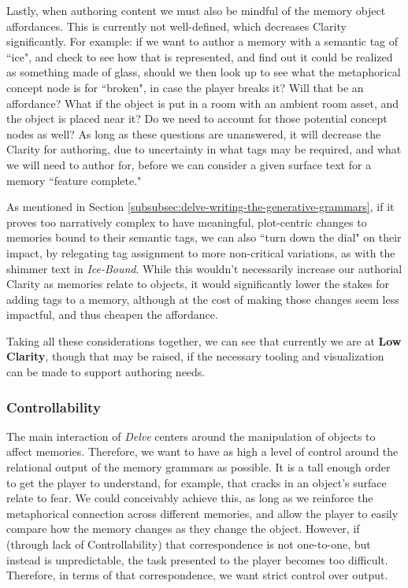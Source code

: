 Lastly, when authoring content we must also be mindful of the memory object affordances. This is currently not well-defined, which decreases Clarity significantly. For example: if we want to author a memory with a semantic tag of ``ice", and check to see how that is represented, and find out it could be realized as something made of glass, should we then look up to see what the metaphorical concept node is for ``broken", in case the player breaks it? Will that be an affordance? What if the object is put in a room with an ambient room asset, and the object is placed near it? Do we need to account for those potential concept nodes as well? As long as these questions are unanswered, it will decrease the Clarity for authoring, due to uncertainty in what tags may be required, and what we will need to author for, before we can consider a given surface text for a memory ``feature complete."

As mentioned in Section \ref{subsubsec:delve-writing-the-generative-grammars}, if it proves too narratively complex to have meaningful, plot-centric changes to memories bound to their semantic tags, we can also ``turn down the dial" on their impact, by relegating tag assignment to more non-critical variations, as with the shimmer text in \textit{Ice-Bound}. While this wouldn't necessarily increase our authorial Clarity as memories relate to objects, it would significantly lower the stakes for adding tags to a memory, although at the cost of making those changes seem less impactful, and thus cheapen the affordance.

Taking all these considerations together, we can see that currently we are at \textbf{Low Clarity}, though that may be raised, if the necessary tooling and visualization can be made to support authoring needs.

\subsubsection{Controllability}\label{subsubsec:delve-controllability}

The main interaction of \textit{Delve} centers around the manipulation of objects to affect memories. Therefore, we want to have as high a level of control around the relational output of the memory grammars as possible. It is a tall enough order to get the player to understand, for example, that cracks in an object's surface relate to fear. We could conceivably achieve this, as long as we reinforce the metaphorical connection across different memories, and allow the player to easily compare how the memory changes as they change the object. However, if (through lack of Controllability) that correspondence is not one-to-one, but instead is unpredictable, the task presented to the player becomes too difficult. Therefore, in terms of that correspondence, we want strict control over output.


